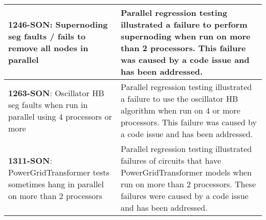 {\begin{longtable}[h] {>{\raggedright\small}m{2in}|>{\raggedright\let\\\tabularnewline\small}m{3.5in}}
\textbf{1246-SON}: Supernoding seg faults / fails to remove all nodes in parallel &
Parallel regression testing illustrated a failure to perform supernoding when run on more than 2
processors.  This failure was caused by a code issue and has been addressed. 
\\ \hline

\textbf{1263-SON}: Oscillator HB seg faults when run in parallel using 4 processors or more &
Parallel regression testing illustrated a failure to use the oscillator HB algorithm when run on 
4 or more processors.  This failure was caused by a code issue and has been addressed. 
\\ \hline

\textbf{1311-SON}: PowerGridTransformer tests sometimes hang in parallel on more than 2 processors &
Parallel regression testing illustrated failures of circuits that have PowerGridTransformer
models when run on more than 2 processors.  These failures were caused by a code issue and has been
addressed.
\\ \hline


\end{longtable}
}
